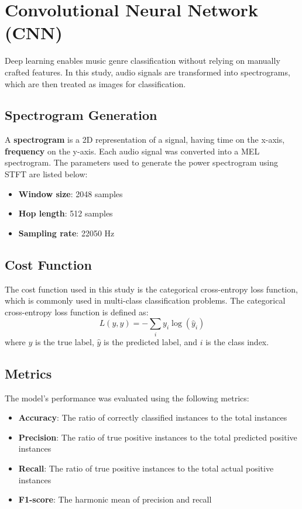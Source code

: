 \documentclass[11.5pt]{article}
\begin{document}
\pagebreak
\section{Convolutional Neural Network (CNN)} \label{sec:cnn}
Deep learning enables music genre classification without relying on manually crafted features. In this study, audio signals are transformed into spectrograms, which are then treated as images for classification.

\subsection{Spectrogram Generation}
A \textbf{spectrogram} is a 2D representation of a signal, having time on the x-axis, \textbf{frequency} on the y-axis. Each audio signal was converted into a MEL spectrogram. The parameters used to generate the power spectrogram using STFT are listed below:
\begin{itemize}
    \item \textbf{Window size}: 2048 samples
    \item \textbf{Hop length}: 512 samples
    \item \textbf{Sampling rate}: 22050 Hz
\end{itemize}

\subsection{Cost Function}
The cost function used in this study is the categorical cross-entropy loss function, which is commonly used in multi-class classification problems. The categorical cross-entropy loss function is defined as:
\begin{equation}
    L(y, \hat{y}) = -\sum_{i} y_i \log(\hat{y}_i)
\end{equation}
where $y$ is the true label, $\hat{y}$ is the predicted label, and $i$ is the class index.

\subsection{Metrics}
The model's performance was evaluated using the following metrics:
\begin{itemize}
    \item \textbf{Accuracy}: The ratio of correctly classified instances to the total instances
    \item \textbf{Precision}: The ratio of true positive instances to the total predicted positive instances
    \item \textbf{Recall}: The ratio of true positive instances to the total actual positive instances
    \item \textbf{F1-score}: The harmonic mean of precision and recall
\end{itemize}
\end{document}
